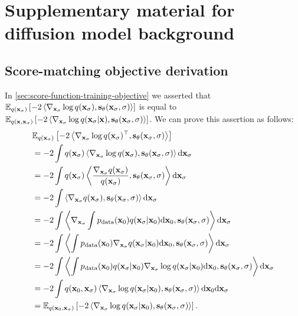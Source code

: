 \chapter{Supplementary material for diffusion model background}

\section{Score-matching objective derivation} \label{sec:proof-that-diffusion-does-score-matching}

In \cref{sec:score-function-training-objective} we asserted that $\mathbb{E}_{q({\mathbf{x}}_\sigma)} \left[ - 2 \left\langle \nabla_{{\mathbf{x}}_\sigma} \log q({\mathbf{x}}_\sigma), {\mathbf{s}}_\theta({\mathbf{x}}_\sigma, \sigma) \right\rangle \right]$ is equal to $\mathbb{E}_{q({\mathbf{x}}, {\mathbf{x}}_\sigma)} \left[ -2 \left\langle \nabla_{{\mathbf{x}}_\sigma} \log q({\mathbf{x}}_\sigma|{\mathbf{x}}), {\mathbf{s}}_\theta({\mathbf{x}}_\sigma, \sigma) \right\rangle  \right]$.
We can prove this assertion as follows:
\begin{align}
\allowdisplaybreaks
    & \EX_{q(\rvx_\sigma)} \left[ - 2 \left\langle \nabla_{\rvx_\sigma} \log q(\rvx_\sigma)^\top, \rvs_\theta(\rvx_\sigma, \sigma) \right\rangle \right] \\
    &= - 2 \int q(\rvx_\sigma) \left\langle \nabla_{\rvx_\sigma} \log q(\rvx_\sigma ), \rvs_\theta(\rvx_\sigma, \sigma) \right\rangle \mathrm{d} \rvx_\sigma  \\
    &= - 2 \int q(\rvx_\sigma ) \left\langle \frac{\nabla_{\rvx_\sigma} q(\rvx_\sigma)}{q(\rvx_\sigma )}, \rvs_\theta(\rvx_\sigma, \sigma) \right\rangle \mathrm{d} \rvx_\sigma  \\
    &= - 2 \int \left\langle \nabla_{\rvx_\sigma} q(\rvx_\sigma ), \rvs_\theta(\rvx_\sigma, \sigma) \right\rangle \mathrm{d} \rvx_\sigma  \\
    &= - 2 \int \left\langle \nabla_{\rvx_\sigma} \int \pdata(\rvx_0) q(\rvx_\sigma|\rvx_0) \mathrm{d}\rvx_0, \rvs_\theta(\rvx_\sigma, \sigma) \right\rangle \mathrm{d} \rvx_\sigma  \\
    &= - 2 \int \left\langle \int \pdata(\rvx_0) \nabla_{\rvx_\sigma} q(\rvx_\sigma|\rvx_0) \mathrm{d}\rvx_0, \rvs_\theta(\rvx_\sigma, \sigma) \right\rangle \mathrm{d} \rvx_\sigma  \\
    &= - 2 \int \left\langle \int \pdata(\rvx_0) q(\rvx_\sigma|\rvx_0) \nabla_{\rvx_\sigma} \log q(\rvx_\sigma|\rvx_0) \mathrm{d}\rvx_0, \rvs_\theta(\rvx_\sigma, \sigma) \right\rangle \mathrm{d} \rvx_\sigma  \\
    &= - 2 \int q(\rvx_0, \rvx_\sigma) \left\langle \nabla_{\rvx_\sigma} \log q(\rvx_\sigma|\rvx_0), \rvs_\theta(\rvx_\sigma, \sigma) \right\rangle  \mathrm{d}\rvx_0 \mathrm{d} \rvx_\sigma  \\
    &= \EX_{q(\rvx_0, \rvx_\sigma)} \left[ -2 \left\langle \nabla_{\rvx_\sigma} \log q(\rvx_\sigma|\rvx_0), \rvs_\theta(\rvx_\sigma, \sigma) \right\rangle  \right].
\end{align}
